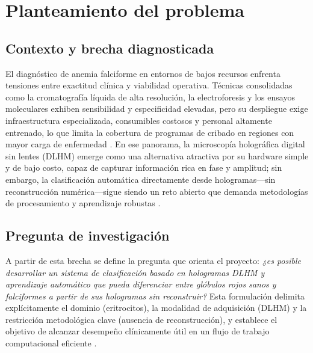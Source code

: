 \chapter{Planteamiento del problema}\label{chap:problema}

\section{Contexto y brecha diagnosticada}
El diagnóstico de anemia falciforme en entornos de bajos recursos enfrenta tensiones entre exactitud clínica y viabilidad operativa. Técnicas consolidadas como la cromatografía líquida de alta resolución, la electroforesis y los ensayos moleculares exhiben sensibilidad y especificidad elevadas, pero su despliegue exige infraestructura especializada, consumibles costosos y personal altamente entrenado, lo que limita la cobertura de programas de cribado en regiones con mayor carga de enfermedad \cite{McGann2017,Shrestha2025,Arishi2021}. En ese panorama, la microscopía holográfica digital sin lentes (DLHM) emerge como una alternativa atractiva por su hardware simple y de bajo costo, capaz de capturar información rica en fase y amplitud; sin embargo, la clasificación automática directamente desde hologramas—sin reconstrucción numérica—sigue siendo un reto abierto que demanda metodologías de procesamiento y aprendizaje robustas \cite{Amann2019,BuitragoDuque2023,OConnor2020}.

\section{Pregunta de investigación}
A partir de esta brecha se define la pregunta que orienta el proyecto: \emph{¿es posible desarrollar un sistema de clasificación basado en hologramas DLHM y aprendizaje automático que pueda diferenciar entre glóbulos rojos sanos y falciformes a partir de sus hologramas sin reconstruir?} Esta formulación delimita explícitamente el dominio (eritrocitos), la modalidad de adquisición (DLHM) y la restricción metodológica clave (ausencia de reconstrucción), y establece el objetivo de alcanzar desempeño clínicamente útil en un flujo de trabajo computacional eficiente \cite{Amann2019,BuitragoDuque2023,OConnor2020}.

